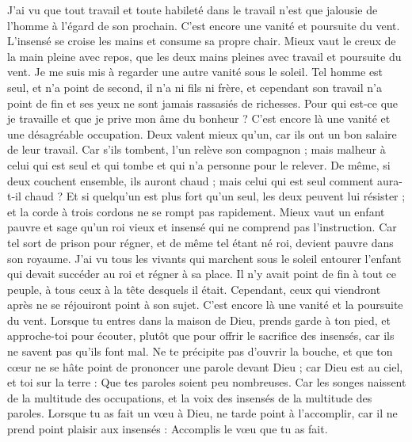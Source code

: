 \begin{multicols}{2}
J'ai vu que tout travail et toute habileté dans le travail n’est que jalousie de l’homme à l’égard de son prochain. C’est encore une vanité et poursuite du vent.
L’insensé se croise les mains et consume sa propre chair.
Mieux vaut le creux de la main pleine avec repos, que les deux mains pleines avec travail et poursuite du vent.
Je me suis mis à regarder une autre vanité sous le soleil.
Tel homme est seul, et n'a point de second, il n'a ni fils ni frère, et cependant son travail n’a point de fin et ses yeux ne sont jamais rassasiés de richesses. Pour qui est-ce que je travaille et que je prive mon âme du bonheur ? C’est encore là une vanité et une désagréable occupation.
Deux valent mieux qu'un, car ils ont un bon salaire de leur travail.
Car s’ils tombent, l'un relève son compagnon ; mais malheur à celui qui est seul et qui tombe et qui n'a personne pour le relever.
De même, si deux couchent ensemble, ils auront chaud ; mais celui qui est seul comment aura-t-il chaud ?
Et si quelqu'un est plus fort qu’un seul, les deux peuvent lui résister ; et la corde à trois cordons ne se rompt pas rapidement.
Mieux vaut un enfant pauvre et sage qu'un roi vieux et insensé qui ne comprend pas l’instruction.
Car tel sort de prison pour régner, et de même tel étant né roi, devient pauvre dans son royaume.
J'ai vu tous les vivants qui marchent sous le soleil entourer l’enfant qui devait succéder au roi et régner à sa place.
Il n’y avait point de fin à tout ce peuple, à tous ceux à la tête desquels il était. Cependant, ceux qui viendront après ne se réjouiront point à son sujet. C’est encore là une vanité et la poursuite du vent.
Lorsque tu entres dans la maison de Dieu, prends garde à ton pied, et approche-toi pour écouter, plutôt que pour offrir le sacrifice des insensés, car ils ne savent pas qu'ils font mal.
\VerseOne{}Ne te précipite pas d’ouvrir la bouche, et que ton cœur ne se hâte point de prononcer une parole devant Dieu ; car Dieu est au ciel, et toi sur la terre : Que tes paroles soient peu nombreuses.
Car les songes naissent de la multitude des occupations, et la voix des insensés de la multitude des paroles.
Lorsque tu as fait un vœu à Dieu, ne tarde point à l'accomplir, car il ne prend point plaisir aux insensés : Accomplis le vœu que tu as fait.

\end{multicols}
